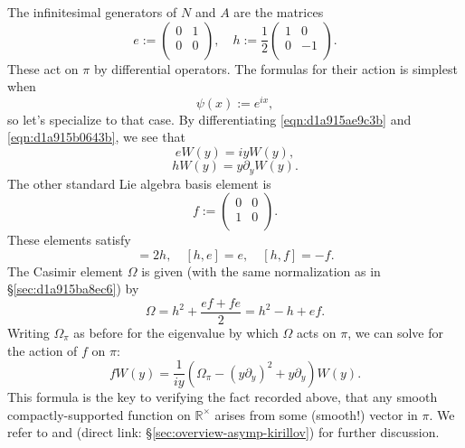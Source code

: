 \documentclass[reqno]{amsart} 
\numberwithin{equation}{section}
\numberwithin{theorem}{section}
\begin{document}
The infinitesimal generators of $N$ and $A$ are the matrices
\begin{equation*}
e :=
\begin{pmatrix}
0 & 1 \\
0 & 0 \\
\end{pmatrix},
\quad
h :=
\frac{1}{2} 
\begin{pmatrix}
1 & 0 \\
0 & -1 \\
\end{pmatrix}.
\end{equation*}
These act on $\pi$ by differential operators.  The formulas for their action is simplest when
\begin{equation}\label{eqn:d1a915c27da9}
\psi(x) := e^{i x},
\end{equation}
so let's specialize to that case.  By differentiating \eqref{eqn:d1a915ae9c3b} and \eqref{eqn:d1a915b0643b}, we see that
\begin{equation}\label{eqn:d1a915a9f0b7}
  e W(y) = i y W(y),
\end{equation}
\begin{equation}\label{eqn:d1a915aa06ba}
h W (y) = y \partial_y W(y).
\end{equation}
The other standard Lie algebra basis element is
\begin{equation*}
f :=
\begin{pmatrix}
0 & 0 \\
1 & 0 \\
\end{pmatrix}.
\end{equation*}
These elements satisfy
\begin{equation*}
  [e,f] = 2 h, \quad
  [h, e] = e, \quad
  [h,f] = - f.
\end{equation*}
The Casimir element $\Omega$ is given (with the same normalization as in \S\ref{sec:d1a915ba8ec6}) by
\begin{equation*}
  \Omega =
  h^2 + \frac{e f + f e}{2}
  =
h^2 - h + e f.
\end{equation*}
Writing $\Omega_\pi$ as before for the eigenvalue by which $\Omega$ acts on $\pi$, we can solve for the action of $f$ on $\pi$:
\begin{equation}\label{eqn:d1a915c0e3d2}
  f W(y)
  =
  \frac{1}{i y} \left(\Omega_\pi - (y \partial_y)^2 + y \partial_y \right) W(y).
\end{equation}
This formula is the key to verifying the fact recorded above, that any smooth compactly-supported function on $\mathbb{R}^\times$ arises from some (smooth!) vector in $\pi$.  We refer to \cite{MR2733072} and \cite[\S12]{2021arXiv210915230N} (direct link: \S\ref{sec:overview-asymp-kirillov}) for further discussion.
\end{document}
